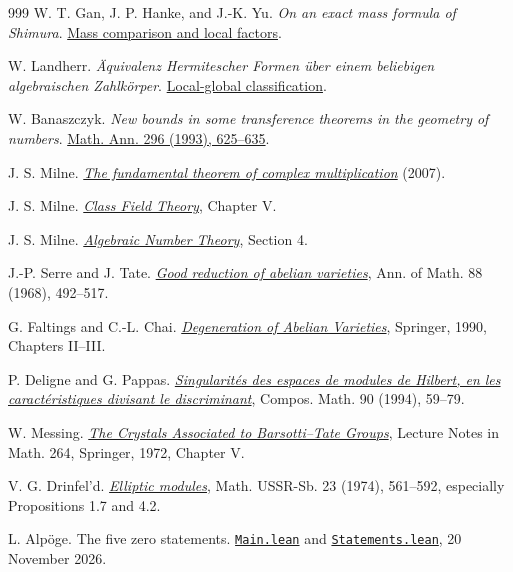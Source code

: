 \documentclass[11pt]{article}
\theoremstyle{definition}
\theoremstyle{plain}
\newcommand{\code}[1]{\texttt{#1}}
\begin{document}
\begin{thebibliography}{999}
W. T. Gan, J. P. Hanke, and J.-K. Yu.
\emph{On an exact mass formula of Shimura}.
\href{https://web.math.princeton.edu/~jonhanke/Web-02/Mass-Formula-of-Shimura/shimura-mass.pdf}{Mass comparison and local factors}.

W. Landherr.
\emph{\"Aquivalenz Hermitescher Formen \"uber einem
beliebigen algebraischen Zahlk\"orper}.
\href{https://webhomes.maths.ed.ac.uk/~v1ranick/papers/landherr.pdf}{Local-global classification}.

W. Banaszczyk.
\emph{New bounds in some transference theorems in the
geometry of numbers}.
\href{https://doi.org/10.1007/BF01445125}{Math. Ann. 296 (1993), 625--635}.

J. S. Milne.
\href{https://jmilne.org/math/articles/2007c.pdf}
{\emph{The fundamental theorem of complex multiplication}} (2007).

J. S. Milne.
\href{https://www.jmilne.org/math/CourseNotes/CFT.pdf}
{\emph{Class Field Theory}}, Chapter V.

J. S. Milne.
\href{https://www.jmilne.org/math/CourseNotes/ANT301.pdf}
{\emph{Algebraic Number Theory}}, Section 4.

J.-P. Serre and J. Tate.
\href{https://doi.org/10.2307/1970722}
{\emph{Good reduction of abelian varieties}},
Ann. of Math. 88 (1968), 492--517.

G. Faltings and C.-L. Chai.
\href{https://doi.org/10.1007/978-3-662-02632-8}
{\emph{Degeneration of Abelian Varieties}},
Springer, 1990, Chapters II--III.

P. Deligne and G. Pappas.
\href{https://www.numdam.org/item/?id=CM_1994__90_1_59_0}
{\emph{Singularit\'es des espaces de modules de Hilbert,
en les caract\'eristiques divisant le discriminant}},
Compos. Math. 90 (1994), 59--79.

W. Messing.
\href{https://doi.org/10.1007/BFb0058301}
{\emph{The Crystals Associated to Barsotti--Tate Groups}},
Lecture Notes in Math. 264, Springer, 1972, Chapter V.

V. G. Drinfel'd.
\href{https://www.mathnet.ru/eng/sm3735}{\emph{Elliptic modules}},
Math. USSR-Sb. 23 (1974), 561--592, especially Propositions
1.7 and 4.2.

L. Alp\"oge. The five zero statements.
\href{https://github.com/Deicyde/riemann-hypothesis/blob/a172c464fd4bcfc4f53e394dcba45d742b1409a6/src/Main.lean}{\code{Main.lean}} and
\href{https://github.com/Deicyde/riemann-hypothesis/blob/a172c464fd4bcfc4f53e394dcba45d742b1409a6/src/Statements.lean}{\code{Statements.lean}}, 20 November 2026.


\end{thebibliography}
\end{document}
